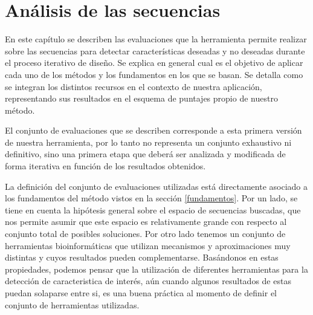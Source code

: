 \chapter{Análisis de las secuencias}
\label{tools}

En este capítulo se describen las evaluaciones que la herramienta permite realizar sobre las secuencias para detectar características deseadas y no deseadas durante el proceso iterativo de diseño. 
Se explica en general cual es el objetivo de aplicar cada uno de los métodos y los fundamentos en los que se basan.
Se detalla como se integran los distintos recursos en el contexto de nuestra aplicación, representando sus resultados en el esquema de puntajes propio de nuestro método.

El conjunto de evaluaciones que se describen corresponde a esta primera versión de nuestra herramienta, por lo tanto no representa un conjunto exhaustivo ni definitivo, 
sino una primera etapa que deberá ser analizada y modificada de forma iterativa en función de los resultados obtenidos.

La definición del conjunto de evaluaciones utilizadas está directamente asociado a los fundamentos del método vistos en la sección \ref{fundamentos}.
Por un lado, se tiene en cuenta la hipótesis general sobre el espacio de secuencias buscadas, que nos permite asumir que este espacio es relativamente grande con respecto al conjunto total de posibles soluciones.
Por otro lado tenemos un conjunto de herramientas bioinformáticas que utilizan mecanismos y aproximaciones muy distintas y cuyos resultados pueden complementarse. 
Basándonos en estas propiedades, podemos pensar que la utilización de diferentes herramientas para la detección de caracteristica de interés, aún cuando algunos resultados de estas puedan solaparse entre si,
es una buena práctica al momento de definir el conjunto de herramientas utilizadas. 

